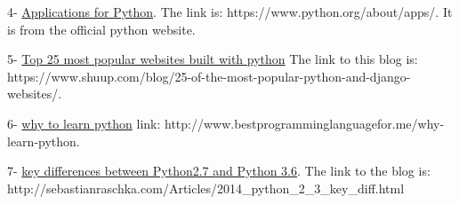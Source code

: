 \documentclass[11pt]{article}
\begin{document}
4- \href{https://www.python.org/about/apps/}{Applications for Python}.
The link is: https://www.python.org/about/apps/. It is from the official
python website.

5-
\href{https://www.shuup.com/blog/25-of-the-most-popular-python-and-django-websites/}{Top
25 most popular websites built with python} The link to this blog is:
https://www.shuup.com/blog/25-of-the-most-popular-python-and-django-websites/.

6- \href{http://www.bestprogramminglanguagefor.me/why-learn-python}{why
to learn python} link:
http://www.bestprogramminglanguagefor.me/why-learn-python.

7-
\href{http://sebastianraschka.com/Articles/2014_python_2_3_key_diff.html}{key
differences between Python2.7 and Python 3.6}. The link to the blog is:
http://sebastianraschka.com/Articles/2014\_python\_2\_3\_key\_diff.html


    
    
    
    
\end{document}

